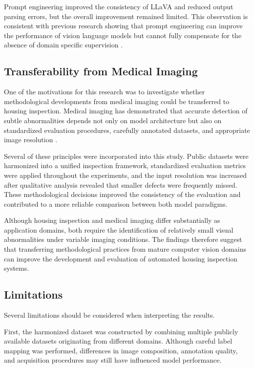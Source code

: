Prompt engineering improved the consistency of LLaVA and reduced output parsing errors, but the overall improvement remained limited. This observation is consistent with previous research showing that prompt engineering can improve the performance of vision language models but cannot fully compensate for the absence of domain specific supervision \cite{malla_enhancing_2025}.

\subsection{Transferability from Medical Imaging}

One of the motivations for this research was to investigate whether methodological developments from medical imaging could be transferred to housing inspection. Medical imaging has demonstrated that accurate detection of subtle abnormalities depends not only on model architecture but also on standardized evaluation procedures, carefully annotated datasets, and appropriate image resolution \cite{litjens_deep_2017,kamraoui_longitudinal_2022,rana_yolo_2025}.

Several of these principles were incorporated into this study. Public datasets were harmonized into a unified inspection framework, standardized evaluation metrics were applied throughout the experiments, and the input resolution was increased after qualitative analysis revealed that smaller defects were frequently missed. These methodological decisions improved the consistency of the evaluation and contributed to a more reliable comparison between both model paradigms.

Although housing inspection and medical imaging differ substantially as application domains, both require the identification of relatively small visual abnormalities under variable imaging conditions. The findings therefore suggest that transferring methodological practices from mature computer vision domains can improve the development and evaluation of automated housing inspection systems.

\subsection{Limitations}

Several limitations should be considered when interpreting the results.

First, the harmonized dataset was constructed by combining multiple publicly available datasets originating from different domains. Although careful label mapping was performed, differences in image composition, annotation quality, and acquisition procedures may still have influenced model performance.

